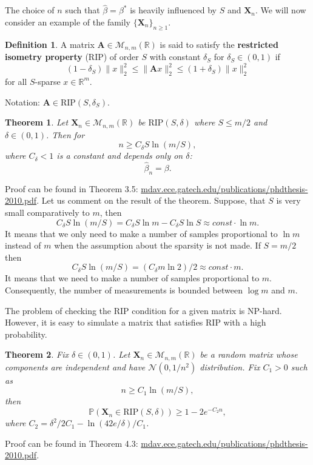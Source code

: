 \documentclass[11pt]{article}
\numberwithin{equation}{section}
\newtheorem{theorem}{Theorem}[section]
\theoremstyle{definition}
\newtheorem{definition}{Definition}[section]
\begin{document}
The choice of $n$ such that $\hat \beta = \beta^*$ is heavily influenced by $S$ and $\mathbf X_n$.
We will now consider an example of the family $\{\mathbf X_n\}_{n \geqslant 1}$.

\begin{definition}
    \label{def:rip}
    A matrix $\mathbf A \in \mathcal M_{n, m}(\mathbb R)$ is said to satisfy the \textbf{restricted isometry property} (RIP) of order $S$ with constant $\delta_S$ for $\delta_S \in (0, 1)$ if
    $$ (1 - \delta_S) \|x\|_2^2 \leqslant \|\mathbf A x\|_2^2 \leqslant (1 + \delta_S) \|x\|_2^2 $$
    for all $S$-sparse $x \in \mathbb R^m$.
    
    Notation: $\mathbf A \in \textrm{RIP}(S, \delta_S)$.
\end{definition}

\begin{theorem}
    \label{theorem:CSforRIP}
    Let $\mathbf X_n \in \mathcal M_{n, m} (\mathbb R)$ be $\textrm{RIP}(S, \delta)$ where $S \leq m / 2$ and $\delta \in (0, 1)$. Then for
    $$ n \geqslant C_\delta S \ln(m / S), $$
    where $C_\delta < 1$ is a constant and depends only on $\delta$:
    $$ \hat \beta_n = \beta. $$
\end{theorem}
Proof can be found in Theorem 3.5: \url{mdav.ece.gatech.edu/publications/phdthesis-2010.pdf}.
Let us comment on the result of the theorem.
Suppose, that $S$ is very small comparatively to $m$, then
$$ C_\delta S \ln(m / S) = C_\delta S \ln m - C_\delta S \ln S \approx const \cdot \ln m. $$
It means that we only need to make a number of samples proportional to $\ln m$ instead of $m$ when the assumption about the sparsity is not made.
If $S = m / 2$ then
$$ C_\delta S \ln(m / S) = (C_\delta m \ln 2) / 2 \approx const \cdot m. $$
It means that we need to make a number of samples proportional to $m$.
Consequently, the number of measurements is bounded between $\log m$ and $m$.

The problem of checking the RIP condition for a given matrix is NP-hard.
However, it is easy to simulate a matrix that satisfies RIP with a high probability.

\begin{theorem}
    Fix $\delta \in (0, 1)$.
    Let $\mathbf X_n \in \mathcal M_{n, m} (\mathbb R)$ be a random matrix whose components are independent and have $\mathcal N(0, 1/n^2)$ distribution.
    Fix $C_1 > 0$ such as
    $$ n \geqslant C_1 \ln(m / S), $$
    then 
    $$ \mathbb P(\mathbf X_n \in \textrm{RIP}(S, \delta)) \geq 1 - 2 e^{-C_2 n}, $$
    where $C_2 = \delta^2/2C_1 - \ln (42 e / \delta) / C_1$.
\end{theorem}
Proof can be found in Theorem 4.3: \url{mdav.ece.gatech.edu/publications/phdthesis-2010.pdf}.
\end{document}
